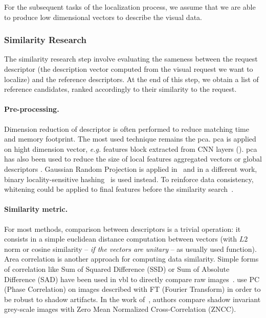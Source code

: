 For the subsequent tasks of the localization process, we assume that we are able to produce low dimensional vectors to describe the visual data.

\subsubsection{Similarity Research}
\label{subsubsec:similarity_research}

The similarity research step involve evaluating the sameness between the request descriptor (\ie the description vector computed from the visual request we want to localize) and the reference descriptors. At the end of this step, we obtain a list of reference candidates, ranked accordingly to their similarity to the request.

\paragraph{Pre-processing.}
Dimension reduction of descriptor is often performed to reduce matching time and memory footprint. The most used technique remains the \ac{pca}. \ac{pca} is applied on hight dimension vector, \textit{e.g.} features block extracted from CNN layers (\citep{Arandjelovic2017,Gordo2016}). \ac{pca} has also been used to reduce the size of local features aggregated vectors \citep{Kim2015,Torii2015} or global descriptors \citep{Ni2009}. Gaussian Random Projection is applied in~\citep{Sunderhauf2015a,Panphattarasap2016} and in a different work, binary locality-sensitive hashing~\citep{Sunderhauf2015} is used instead. To reinforce data consistency, whitening could be applied to final features before the similarity search~\citep{Jegou2012a,Gong2014,Tolias2016,Arandjelovic2017,Gordo2016,Radenovic2016}.

\paragraph{Similarity metric.}
For most methods, comparison between descriptors is a trivial operation: it consists in a simple euclidean distance computation between vectors (with $L2$ norm or cosine similarity -- \textit{if the vectors are unitary} -- as usually used function). Area correlation is another approach for computing data similarity. Simple forms of correlation like Sum of Squared Difference (SSD) or Sum of Absolute Difference (SAD) have been used in \ac{vbl} to directly compare raw images~\citep{Poglitsch2015,Milford2015}. \citet{Wan2016} use PC (Phase Correlation) on images described with FT (Fourier Transform) in order to be robust to shadow artifacts. In the work of~\citep{Corke2013}, authors compare shadow invariant grey-scale images with Zero Mean Normalized Cross-Correlation (ZNCC).


